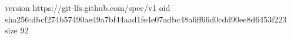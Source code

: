 version https://git-lfs.github.com/spec/v1
oid sha256:dbcf274b57490ae49a7bf44aad1fe4e07adbc48a6ff66d0cdd90ee8d6453f223
size 92
